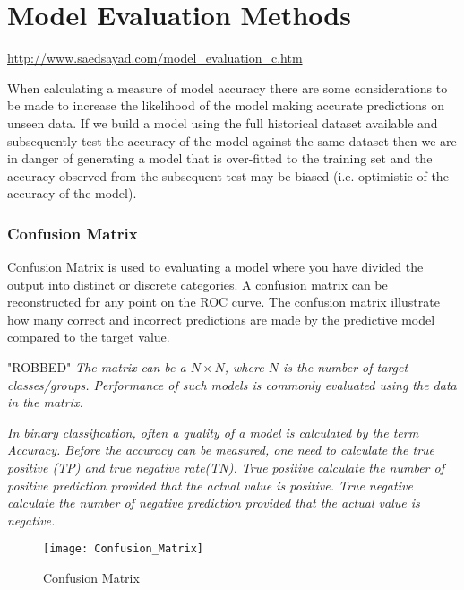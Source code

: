 \section{Model Evaluation Methods}\label{modelEval}

\url{http://www.saedsayad.com/model_evaluation_c.htm}


When calculating a measure of model accuracy there are some considerations to be made to increase the likelihood of the model making accurate predictions on unseen data. If we build a model using the full historical dataset available and subsequently test the accuracy of the model against the same dataset then we are in danger of generating a model that is over-fitted to the training set and the accuracy observed from the subsequent test may be biased (i.e. optimistic of the accuracy of the model).

\subsubsection{Confusion Matrix}
Confusion Matrix is used to evaluating a model where you have divided the output into distinct or discrete categories. A confusion matrix can be reconstructed for any point on the ROC curve. The confusion matrix illustrate how many correct and incorrect predictions are made by the predictive model compared to the target value. 

"ROBBED" \textit{The matrix can be a $N \times N$, where $N$ is the number of target classes/groups. Performance of such models is commonly evaluated using the data in the matrix.}

\textit{In binary classification, often a quality of a model is calculated by the term Accuracy. Before the accuracy can be measured, one need to calculate the true positive (TP) and true negative rate(TN). True positive calculate the number of positive prediction provided that the actual value is positive. True negative calculate the number of negative prediction provided that the actual value is negative.}

\begin{figure}[H]
	\texttt{[image: Confusion\_Matrix]}
	\caption[Confusion Matrix]
	{Confusion Matrix}
	\label{fig:ConfusionMatrix}
\end{figure}

